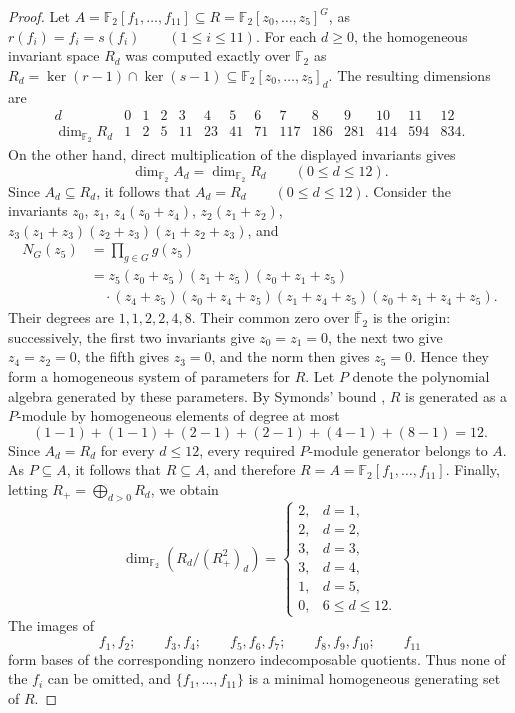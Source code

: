 \documentclass[11pt]{article}
\theoremstyle{definition}
\begin{document}
	
	\begin{proof}
		Let $A=\mathbb F _2[f_1,\ldots,f_{11}] \subseteq R=\mathbb F_2[z_0,\ldots,z_5]^G$, as $r(f_i)=f_i=s(f_i) \qquad (1\leq i\leq11)$. For each \(d\geq0\), the homogeneous invariant space \(R_d\) was computed exactly over \(\mathbb F _2\) as $R_d=\ker(r-1)\cap\ker(s-1) \subseteq \mathbb F _2[z_0,\ldots,z_5]_d$. The resulting dimensions are
		\[
		\begin{array}{c|rrrrrrrrrrrrr}
			d&0&1&2&3&4&5&6&7&8&9&10&11&12\\ \hline
			\dim_{\mathbb F _2}R_d
			&1&2&5&11&23&41&71&117&186&281&414&594&834.
		\end{array}
		\]
		On the other hand, direct multiplication of the displayed invariants
		gives
		\[
		\dim_{\mathbb F _2}A_d
		=
		\dim_{\mathbb F _2}R_d
		\qquad (0\leq d\leq12).
		\]
		Since \(A_d\subseteq R_d\), it follows that $A_d=R_d \qquad (0\leq d\leq12)$. Consider the invariants $z_0$, $z_1$, $z_4(z_0+z_4)$, $z_2(z_1+z_2)$, $z_3(z_1+z_3)(z_2+z_3)(z_1+z_2+z_3)$, and
		\[
		\begin{aligned}
		N_G(z_5)
		&=\prod_{g\in G}g(z_5)\\
		&=z_5(z_0+z_5)(z_1+z_5)(z_0+z_1+z_5)\\
		&\quad\cdot(z_4+z_5)(z_0+z_4+z_5)
		(z_1+z_4+z_5)(z_0+z_1+z_4+z_5).
		\end{aligned}
		\]
		Their degrees are $1,1,2,2,4,8$. Their common zero over $\overline{\mathbb F}_2$ is the origin: successively, the first two invariants give $z_0=z_1=0$, the next two give $z_4=z_2=0$, the fifth gives $z_3=0$, and the norm then gives $z_5=0$. Hence they form a homogeneous system of parameters for $R$. Let $P$ denote the polynomial algebra generated by these parameters. By Symonds' bound \cite{Sy}, $R$ is generated as a $P$-module by homogeneous elements of degree at most
		\[
		(1-1)+(1-1)+(2-1)+(2-1)+(4-1)+(8-1)=12.
		\]
		Since $A_d=R_d$ for every $d\leq12$, every required $P$-module generator belongs to $A$. As $P\subseteq A$, it follows that $R\subseteq A$, and therefore $R=A=\mathbb F _2[f_1,\ldots,f_{11}]$. Finally, letting $R_+=\bigoplus_{d>0}R_d$, we obtain
		\[
		\dim_{\mathbb F _2}
		\left(R_d/(R_+^2)_d\right)
		=
		\begin{cases}
			2,&d=1,\\
			2,&d=2,\\
			3,&d=3,\\
			3,&d=4,\\
			1,&d=5,\\
			0,&6\leq d\leq12.
		\end{cases}
		\]
		The images of
		\[
		f_1,f_2;\qquad
		f_3,f_4;\qquad
		f_5,f_6,f_7;\qquad
		f_8,f_9,f_{10};\qquad
		f_{11}
		\]
		form bases of the corresponding nonzero indecomposable quotients.
		Thus none of the \(f_i\) can be omitted, and
		\(\{f_1,\ldots,f_{11}\}\) is a minimal homogeneous generating set of
		\(R\).
	\end{proof}
	
\end{document}
